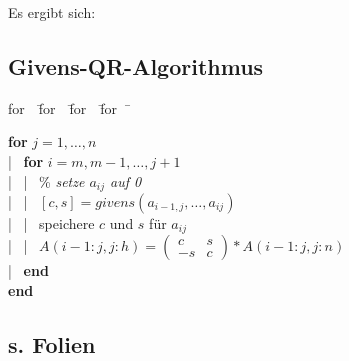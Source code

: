 \documentclass[ngerman,fontsize=11pt, paper=a4, parskip=half, titlepage=true, toc=bib]{scrbook}
\newenvironment{pseudocode}[1]{ %
		\begin{minipage}{#1}
			\begin{framed}
				\hspace*{1em}	
				\begin{minipage}{#1}
					\begin{tabbing}
						for~~\= for~~\= for~~\= for~~\= \kill
	}
	{ %
					\end{tabbing}
				\end{minipage}
				\hspace*{1em}
			\end{framed}
		\end{minipage}
	}
\begin{document}
	
	Es ergibt sich:
	
	\subsection{Givens-QR-Algorithmus} 
	
	\begin{pseudocode}{0.7\linewidth}
		\textbf{for} $j=1, \dotsc , n$ \\
		|~	\>	\textbf{for} $i=m, m-1, \dotsc , j+1$ \\
		|~	\>		|~	\>\% \textit{setze $a_{ij}$ auf 0} \\
		|~	\>		|~	\>$[c,s] = givens(a_{i-1,j}, \dotsc, a_{ij}) $\\
		|~	\>		|~	\>speichere $c$ und $s$ für $a_{ij}$ \\
		|~	\>		|~	\>$A(i-1:j, j:h) =\left( \begin{smallmatrix}c & s\\ -s & c	\end{smallmatrix}\right) * A(i-1:j, j:n)$ \\
		|~	\> \textbf{end}\\
		\textbf{end}							
	\end{pseudocode}
	
	\subsection{s. Folien} %
	
	
\end{document}

